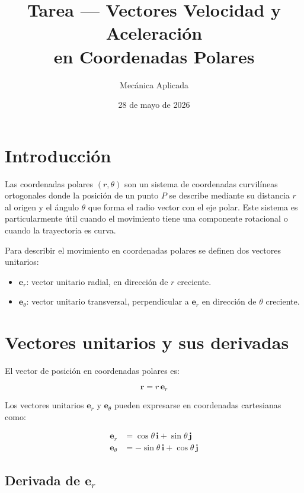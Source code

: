 \documentclass[12pt,a4paper]{article}
\title{Tarea --- Vectores Velocidad y Aceleración\\en Coordenadas Polares}
\author{Mecánica Aplicada}
\date{28 de mayo de 2026}
\begin{document}
\maketitle

\section{Introducción}

Las coordenadas polares $(r,\theta)$ son un sistema de coordenadas curvilíneas
ortogonales donde la posición de un punto $P$ se describe mediante su distancia
$r$ al origen y el ángulo $\theta$ que forma el radio vector con el eje polar.
Este sistema es particularmente útil cuando el movimiento tiene una componente
rotacional o cuando la trayectoria es curva.

Para describir el movimiento en coordenadas polares se definen dos vectores
unitarios:
\begin{itemize}
    \item $\mathbf{e}_r$: vector unitario radial, en dirección de $r$ creciente.
    \item $\mathbf{e}_\theta$: vector unitario transversal, perpendicular a
          $\mathbf{e}_r$ en dirección de $\theta$ creciente.
\end{itemize}

\section{Vectores unitarios y sus derivadas}

El vector de posición en coordenadas polares es:

\begin{equation}
    \mathbf{r} = r\,\mathbf{e}_r
    \label{eq:posicion}
\end{equation}

Los vectores unitarios $\mathbf{e}_r$ y $\mathbf{e}_\theta$ pueden expresarse
en coordenadas cartesianas como:

\begin{align}
    \mathbf{e}_r &= \cos\theta\,\mathbf{i} + \sin\theta\,\mathbf{j} \label{eq:er} \\
    \mathbf{e}_\theta &= -\sin\theta\,\mathbf{i} + \cos\theta\,\mathbf{j} \label{eq:etheta}
\end{align}

\subsection{Derivada de $\mathbf{e}_r$}
\end{document}
